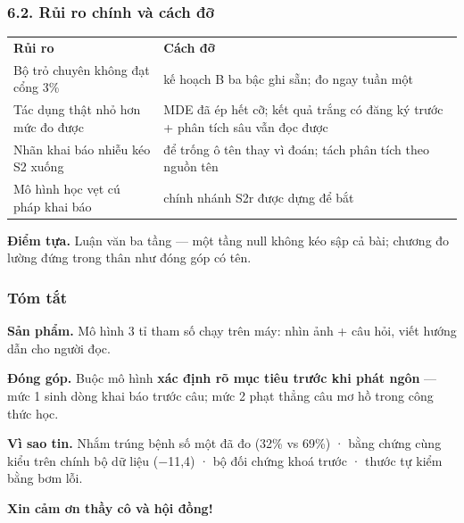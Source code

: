 \documentclass[10pt]{beamer}
\newcommand{\vd}[1]{{\color{vdblue}\textbf{#1}}}
\newcommand{\chred}[1]{{\color{chapred}\textbf{#1}}}
\newcommand{\nv}[1]{{\color{daunavy}\textbf{#1}}}
\begin{document}
\begin{frame}
  \frametitle{6.2. Rủi ro chính và cách đỡ}
  \begin{block}{}
    \centering
    {\small
    \begin{tabular}{p{} p{}}
      \nv{Rủi ro} & \nv{Cách đỡ}\\[0.5ex]
      Bộ trỏ chuyên không đạt cổng 3\% & kế hoạch B ba bậc ghi sẵn; đo ngay tuần một\\[0.6ex]
      Tác dụng thật nhỏ hơn mức đo được & MDE đã ép hết cỡ; kết quả trắng có đăng ký trước + phân tích sâu vẫn đọc được\\[0.6ex]
      Nhãn khai báo nhiễu kéo S2 xuống & để trống ô tên thay vì đoán; tách phân tích theo nguồn tên\\[0.6ex]
      Mô hình học vẹt cú pháp khai báo & chính nhánh S2r được dựng để bắt\\
    \end{tabular}}
  \end{block}
  \begin{block}{}
    \vd{Điểm tựa.} Luận văn ba tầng --- một tầng null không kéo sập cả bài; chương đo lường đứng trong thân như đóng góp có tên.
  \end{block}
\end{frame}

\begin{frame}
  \frametitle{Tóm tắt}
  \begin{block}{}
    \nv{Sản phẩm.} Mô hình 3 tỉ tham số chạy trên máy: nhìn ảnh + câu hỏi, viết hướng dẫn cho người đọc.
  \end{block}
  \begin{block}{}
    \nv{Đóng góp.} Buộc mô hình \chred{xác định rõ mục tiêu trước khi phát ngôn} --- mức 1 sinh dòng khai báo trước câu; mức 2 phạt thẳng câu mơ hồ trong công thức học.
  \end{block}
  \begin{block}{}
    \nv{Vì sao tin.} Nhắm trúng bệnh số một đã đo (32\% vs 69\%) · bằng chứng cùng kiểu trên chính bộ dữ liệu ($-$11,4) · bộ đối chứng khoá trước · thước tự kiểm bằng bơm lỗi.
  \end{block}
  \vspace{1.6ex}
  \begin{center}
    {\color{daunavy}\bfseries Xin cảm ơn thầy cô và hội đồng!}
  \end{center}
\end{frame}
\end{document}
